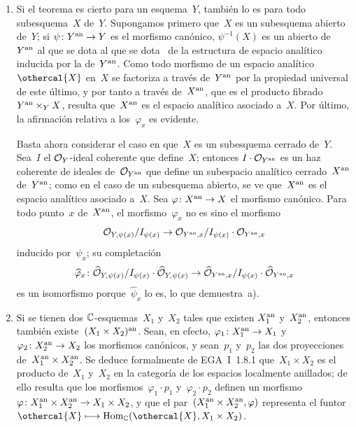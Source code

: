 \begin{enumerate}
\item[a)] Si el teorema es cierto para un esquema~$Y$, también lo es para
todo subesquema~$X$ de~$Y$. Supongamos primero que~$X$ es un subesquema
abierto de~$Y$; si $\psi\colon Y^\an\to Y$ es el morfismo canónico,
$\psi^{-1}(X)$ es un abierto
de~$Y^\an$
{al que se dota}
{al que se dota}%
~de la estructura de espacio analítico inducida por la de~$Y^\an$. Como todo
morfismo de un espacio analítico~$\othercal{X}$ en~$X$ se factoriza a través
de~$Y^\an$ por la propiedad universal de este último, y por tanto a través
de~$X^\an$, que es el producto fibrado~$Y^\an\times_YX$, resulta que~$X^\an$
es el espacio analítico asociado a~$X$. Por último, la afirmación relativa a
los~$\varphi_x$ es evidente.

Basta ahora considerar el caso en que~$X$ es un subesquema cerrado de~$Y$.
Sea~$I$ el $\cal{O}_Y$-ideal coherente que define~$X$; entonces
$I\cdot\cal{O}_{Y^\an}$ es un haz coherente de ideales de~$\cal{O}_{Y^\an}$
que define un subespacio analítico cerrado~$X^\an$ de~$Y^\an$; como en el
caso de un subesquema abierto, se ve que~$X^\an$ es el espacio analítico
asociado a~$X$. Sea $\varphi\colon X^\an\to X$ el morfismo canónico. Para
todo punto~$x$ de~$X^\an$, el morfismo~$\varphi_x$ no es sino el morfismo
$$
\cal{O}_{Y,\psi(x)}/I_{\psi(x)}\to
\cal{O}_{Y^\an,x}/I_{\psi(x)}\cdot\cal{O}_{Y^\an,x}
$$
inducido por~$\psi_x$; su completación
$$
\widehat{\varphi}_x\colon
\widehat{\cal{O}}_{Y,\psi(x)}/I_{\psi(x)}\cdot\widehat{\cal{O}}_{Y,\psi(x)}
\to\widehat{\cal{O}}_{Y^\an,x}/I_{\psi(x)}\cdot\widehat{\cal{O}}_{Y^\an,x}
$$
es un isomorfismo porque~$\widehat\psi_x$ lo es, lo que demuestra~a).

\item[b)] Si se tienen dos $\CC$-esquemas~$X_1$ y~$X_2$ tales que existen
$X_1^\an$ y~$X_2^\an$, entonces también existe~$(X_1\times X_2)^\an$. Sean,
en efecto, $\varphi_1\colon X_1^\an\to X_1$ y
$\varphi_2\colon X_2^\an\to X_2$ los morfismos canónicos, y sean~$p_1$
y~$p_2$ las dos proyecciones de~$X_1^\an\times X_2^\an$. Se deduce
formalmente de EGA~I~1.8.1 que~$X_1\times X_2$ es el producto de~$X_1$ y~$X_2$
en la categoría de los espacios localmente anillados; de ello resulta que
los morfismos~$\varphi_1\cdot p_1$ y~$\varphi_2\cdot p_2$ definen un
morfismo $\varphi\colon X_1^\an\times X_2^\an\to X_1\times X_2$, y que el
par~$(X_1^\an\times X_2^\an,\varphi)$ representa el funtor
$\othercal{X}\mto\Hom_\CC(\othercal{X},X_1\times X_2)$.


\end{enumerate}
